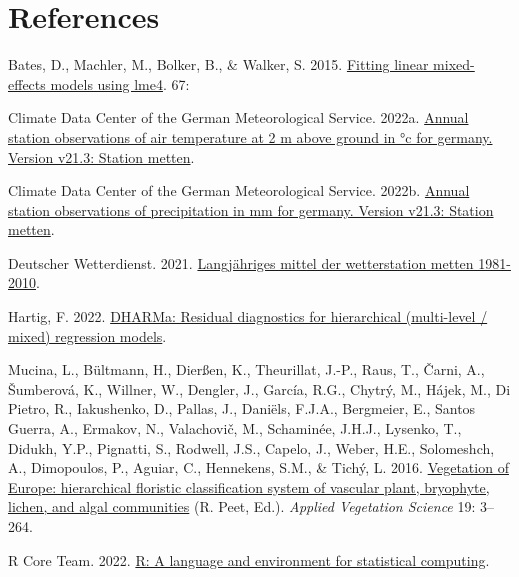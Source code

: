 \documentclass[
]{article}
\newlength{\cslhangindent}
\newlength{\cslentryspacingunit} %
\newenvironment{CSLReferences}[2] %
 {%
  \setlength{\parindent}{0pt}
  \ifodd #1
  \let\oldpar\par
  \def\par{\hangindent=\cslhangindent\oldpar}
  \fi
  \setlength{\parskip}{#2\cslentryspacingunit}
 }%
 {}
\begin{document}
\hypertarget{references}{%
\section*{References}\label{references}}

\hypertarget{refs}{}
\begin{CSLReferences}{1}{0}
\leavevmode{}%
Bates, D., Machler, M., Bolker, B., \& Walker, S. 2015. \href{https://doi.org/10.18637/jss.v067.i01}{Fitting linear mixed-effects models using {\textbraceleft}lme4{\textbraceright}}. 67:

\leavevmode{}%
Climate Data Center of the German Meteorological Service. 2022a. \href{https://cdc.dwd.de/portal/}{Annual station observations of air temperature at 2 m above ground in °c for germany. Version v21.3: Station metten}.

\leavevmode{}%
Climate Data Center of the German Meteorological Service. 2022b. \href{https://cdc.dwd.de/portal/}{Annual station observations of precipitation in mm for germany. Version v21.3: Station metten}.

\leavevmode{}%
Deutscher Wetterdienst. 2021. \href{https://www.dwd.de}{Langjähriges mittel der wetterstation metten 1981-2010}.

\leavevmode{}%
Hartig, F. 2022. \href{https://CRAN.R-project.org/package=DHARMa}{DHARMa: Residual diagnostics for hierarchical (multi-level / mixed) regression models}.

\leavevmode{}%
Mucina, L., Bültmann, H., Dierßen, K., Theurillat, J.-P., Raus, T., Čarni, A., Šumberová, K., Willner, W., Dengler, J., García, R.G., Chytrý, M., Hájek, M., Di Pietro, R., Iakushenko, D., Pallas, J., Daniëls, F.J.A., Bergmeier, E., Santos Guerra, A., Ermakov, N., Valachovič, M., Schaminée, J.H.J., Lysenko, T., Didukh, Y.P., Pignatti, S., Rodwell, J.S., Capelo, J., Weber, H.E., Solomeshch, A., Dimopoulos, P., Aguiar, C., Hennekens, S.M., \& Tichý, L. 2016. \href{https://doi.org/10.1111/avsc.12257}{Vegetation of Europe: hierarchical floristic classification system of vascular plant, bryophyte, lichen, and algal communities} (R. Peet, Ed.). \emph{Applied Vegetation Science} 19: 3--264.

\leavevmode{}%
R Core Team. 2022. \href{https://www.R-project.org/}{R: A language and environment for statistical computing}.

\end{CSLReferences}
\end{document}
